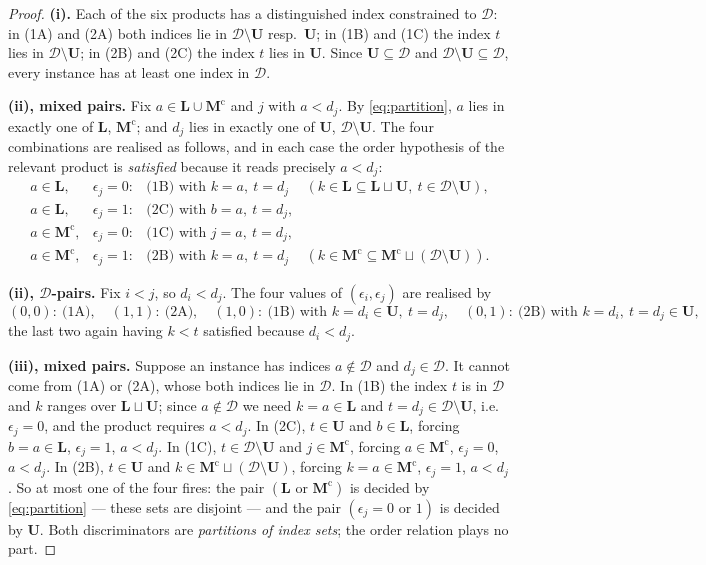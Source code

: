 \documentclass[11pt]{article}
\theoremstyle{plain}
\theoremstyle{definition}
\theoremstyle{remark}
\newcommand{\bM}{\mathbf M}
\newcommand{\bL}{\mathbf L}
\newcommand{\bU}{\mathbf U}
\newcommand{\cD}{\mathcal D}
\newcommand{\cm}{{\mathrm c}}
\begin{document}
\begin{proof}
\textbf{(i).} Each of the six products has a distinguished index constrained to
$\cD$: in (1A) and (2A) both indices lie in $\cD\setminus\bU$ resp.\ $\bU$; in (1B)
and (1C) the index $t$ lies in $\cD\setminus\bU$; in (2B) and (2C) the index $t$
lies in $\bU$. Since $\bU\subseteq\cD$ and $\cD\setminus\bU\subseteq\cD$, every
instance has at least one index in $\cD$.

\textbf{(ii), mixed pairs.} Fix $a\in\bL\cup\bM^\cm$ and $j$ with $a<d_j$. By
\eqref{eq:partition}, $a$ lies in exactly one of $\bL$, $\bM^\cm$; and $d_j$ lies
in exactly one of $\bU$, $\cD\setminus\bU$. The four combinations are realised as
follows, and in each case the order hypothesis of the relevant product is
\emph{satisfied} because it reads precisely $a<d_j$:
\[
\begin{array}{llll}
a\in\bL, & \epsilon_j=0: & \text{(1B) with }k=a,\ t=d_j &
  (k\in\bL\subseteq\bL\sqcup\bU,\ t\in\cD\setminus\bU),\\
a\in\bL, & \epsilon_j=1: & \text{(2C) with }b=a,\ t=d_j, &\\
a\in\bM^\cm, & \epsilon_j=0: & \text{(1C) with }j=a,\ t=d_j, &\\
a\in\bM^\cm, & \epsilon_j=1: & \text{(2B) with }k=a,\ t=d_j &
  (k\in\bM^\cm\subseteq\bM^\cm\sqcup(\cD\setminus\bU)).
\end{array}
\]

\textbf{(ii), $\cD$-pairs.} Fix $i<j$, so $d_i<d_j$. The four values of
$(\epsilon_i,\epsilon_j)$ are realised by
\[
(0,0):\ \text{(1A)},\quad
(1,1):\ \text{(2A)},\quad
(1,0):\ \text{(1B) with }k=d_i\in\bU,\ t=d_j,\quad
(0,1):\ \text{(2B) with }k=d_i,\ t=d_j\in\bU,
\]
the last two again having $k<t$ satisfied because $d_i<d_j$.

\textbf{(iii), mixed pairs.} Suppose an instance has indices $a\notin\cD$ and
$d_j\in\cD$. It cannot come from (1A) or (2A), whose both indices lie in $\cD$. In
(1B) the index $t$ is in $\cD$ and $k$ ranges over $\bL\sqcup\bU$; since
$a\notin\cD$ we need $k=a\in\bL$ and $t=d_j\in\cD\setminus\bU$, i.e.\
$\epsilon_j=0$, and the product requires $a<d_j$. In (2C), $t\in\bU$ and
$b\in\bL$, forcing $b=a\in\bL$, $\epsilon_j=1$, $a<d_j$. In (1C), $t\in\cD\setminus\bU$ and
$j\in\bM^\cm$, forcing $a\in\bM^\cm$, $\epsilon_j=0$, $a<d_j$. In (2B), $t\in\bU$
and $k\in\bM^\cm\sqcup(\cD\setminus\bU)$, forcing $k=a\in\bM^\cm$, $\epsilon_j=1$,
$a<d_j$. So at most one of the four fires: the pair $(\bL\text{ or }\bM^\cm)$ is
decided by \eqref{eq:partition} --- these sets are disjoint --- and the pair
$(\epsilon_j=0\text{ or }1)$ is decided by $\bU$. Both discriminators are
\emph{partitions of index sets}; the order relation plays no part.


\end{proof}
\end{document}
